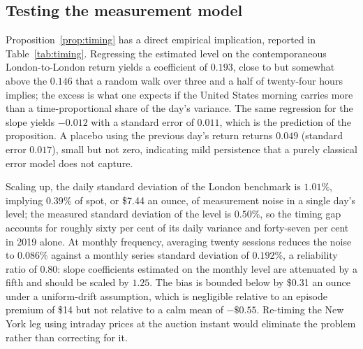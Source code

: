 \documentclass[11pt,a4paper]{article}
\newcounter{proposition}
\begin{document}
\subsection{Testing the measurement model}

Proposition~\ref{prop:timing} has a direct empirical implication, reported in
Table~\ref{tab:timing}. Regressing the estimated level on the contemporaneous
London-to-London return yields a coefficient of $0.193$, close to but somewhat
above the $0.146$ that a random walk over three and a half of twenty-four hours
implies; the excess is what one expects if the United States morning carries
more than a time-proportional share of the day's variance. The same regression
for the slope yields $-0.012$ with a standard error of $0.011$, which is the
prediction of the proposition. A placebo using the previous day's return
returns $0.049$ (standard error $0.017$), small but not zero, indicating mild
persistence that a purely classical error model does not capture.

Scaling up, the daily standard deviation of the London benchmark is $1.01\%$,
implying $0.39\%$ of spot, or \$7.44 an ounce, of measurement noise in a single
day's level; the measured standard deviation of the level is $0.50\%$, so the
timing gap accounts for roughly sixty per cent of its daily variance and
forty-seven per cent in 2019 alone. At monthly frequency, averaging twenty
sessions reduces the noise to $0.086\%$ against a monthly series standard
deviation of $0.192\%$, a reliability ratio of $0.80$: slope coefficients
estimated on the monthly level are attenuated by a fifth and should be scaled
by $1.25$. The bias is bounded below by \$0.31 an ounce under a uniform-drift
assumption, which is negligible relative to an episode premium of \$14 but not
relative to a calm mean of $-\$0.55$. Re-timing the New York leg using intraday
prices at the auction instant would eliminate the problem rather than
correcting for it.
\end{document}
